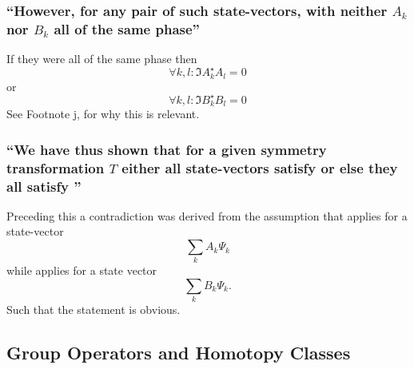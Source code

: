 \subsubsection{\enquote{However, for any pair of such state-vectors, with neither $A_k$ nor $B_k$ \textbf{all of the same phase}} }

If they were all of the same phase then \[\forall k,l: \Im{A_k^\star A_l}=0\]
or \[\forall k,l: \Im{B_k^\star B_l}=0\]
See Footnote j, for why this is relevant.

\subsubsection{\enquote{We have thus shown that for a given symmetry transformation $T$ either all state-vectors satisfy  or else they all satisfy } }
Preceding this a contradiction was derived from the assumption that  applies for a state-vector \[\sum\limits_{k}A_k\Psi_k\] while  applies for a state vector \[\sum\limits_{k}B_k\Psi_k.\]
Such that the statement is obvious.


\subsection{Group Operators and Homotopy Classes}\label{susec:2_B}
